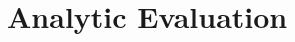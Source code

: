 \documentclass[10pt, conference, compsocconf]{IEEEtran}
\begin{document}
\section{Analytic Evaluation}


%
%



%
%
\end{document}
